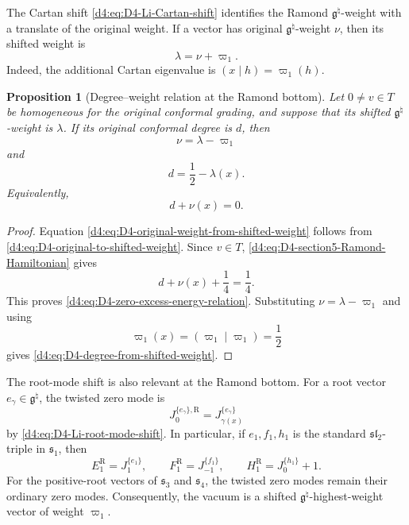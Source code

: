 \documentclass[11pt,reqno]{amsart}
\newtheorem{proposition}[theorem]{Proposition}
\theoremstyle{definition}
\theoremstyle{remark}
\begin{document}
The Cartan shift
\eqref{d4:eq:D4-Li-Cartan-shift} identifies the Ramond
\(\mathfrak g^\natural\)-weight with a translate of the original weight.
If a vector has original \(\mathfrak g^\natural\)-weight \(\nu\), then
its shifted weight is
\begin{equation}
  \lambda=\nu+\varpi_1.
  \label{d4:eq:D4-original-to-shifted-weight}
\end{equation}
Indeed, the additional Cartan eigenvalue is
\((x\mid h)=\varpi_1(h)\).

\begin{proposition}[Degree--weight relation at the Ramond bottom]
\label{d4:prop:D4-degree-weight-relation}
Let \(0\ne v\in T\) be homogeneous for the original conformal grading,
and suppose that its shifted
\(\mathfrak g^\natural\)-weight is \(\lambda\).  If its original
conformal degree is \(d\), then
\begin{equation}
  \nu=\lambda-\varpi_1
  \label{d4:eq:D4-original-weight-from-shifted-weight}
\end{equation}
and
\begin{equation}
  d=\frac12-\lambda(x).
  \label{d4:eq:D4-degree-from-shifted-weight}
\end{equation}
Equivalently,
\begin{equation}
  d+\nu(x)=0.
  \label{d4:eq:D4-zero-excess-energy-relation}
\end{equation}
\end{proposition}

\begin{proof}
Equation \eqref{d4:eq:D4-original-weight-from-shifted-weight} follows from
\eqref{d4:eq:D4-original-to-shifted-weight}.  Since \(v\in T\),
\eqref{d4:eq:D4-section5-Ramond-Hamiltonian} gives
\[
  d+\nu(x)+\frac14=\frac14.
\]
This proves \eqref{d4:eq:D4-zero-excess-energy-relation}.  Substituting
\(\nu=\lambda-\varpi_1\) and using
\[
  \varpi_1(x)
  =(\varpi_1\mid\varpi_1)
  =\frac12
\]
gives \eqref{d4:eq:D4-degree-from-shifted-weight}.
\end{proof}

The root-mode shift is also relevant at the Ramond bottom.  For a root
vector \(e_\gamma\in\mathfrak g^\natural\), the twisted zero mode is
\[
  J_0^{\{e_\gamma\},\mathrm R}
  =J_{\gamma(x)}^{\{e_\gamma\}}
\]
by \eqref{d4:eq:D4-Li-root-mode-shift}.  In particular, if
\(e_1,f_1,h_1\) is the standard \(\mathfrak{sl}_2\)-triple in
\(\mathfrak s_1\), then
\begin{equation}
  E_1^{\mathrm R}=J_1^{\{e_1\}},
  \qquad
  F_1^{\mathrm R}=J_{-1}^{\{f_1\}},
  \qquad
  H_1^{\mathrm R}=J_0^{\{h_1\}}+1.
  \label{d4:eq:D4-first-A1-twisted-zero-modes}
\end{equation}
For the positive-root vectors of \(\mathfrak s_3\) and
\(\mathfrak s_4\), the twisted zero modes remain their ordinary zero
modes.  Consequently, the vacuum is a shifted
\(\mathfrak g^\natural\)-highest-weight vector of weight
\(\varpi_1\).
\end{document}
